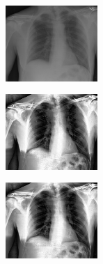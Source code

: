 \documentclass[spanish,twocolumn]{article}
\begin{document}
{\begin{minipage}[b]{1.0\linewidth}
\begin{minipage}[t]{0.3\linewidth}
  	\end{minipage}
  \vspace{0.5cm}
    \label{fig:resultado4}

\end{minipage}
 
\noindent\begin{minipage}[b]{1.0\linewidth}
  \centering
   
   \begin{minipage}[t]{0.3\linewidth}  
   		\centering
        \includegraphics[width=3.5cm]{Figures/entropia_normal_ltg/imagen3.png}
  	\end{minipage}
  \hspace{1pt}
   \begin{minipage}[t]{0.3\linewidth}  
   		\centering
        \includegraphics[width=3.5cm]{Figures/entropia_normal_ltg/imagen3_210_2_0-077765.png}
  	\end{minipage}
  \hspace{1pt}
   \begin{minipage}[t]{0.3\linewidth}  
   		\centering
        \includegraphics[width=3.5cm]{Figures/entropia_normal_ltg/imagen3_29_2_1.png}
  	\end{minipage}
  \vspace{0.5cm}
    \label{fig:resultado5}


\end{minipage}}
\end{document}
